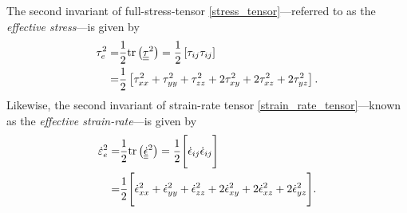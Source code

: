 The second invariant of full-stress-tensor \cref{stress_tensor}---referred to as the  \emph{effective stress}---is given by
\begin{align}
  \tau_e^2 = & \frac{1}{2} \mathrm{tr}\left( \underline{\underline{\tau}}^2 \right) = \frac{1}{2} \left[ \tau_{ij} \tau_{ij} \right] \notag \\
  \label{effectivstress}
  = &\frac{1}{2} \left[ \tau_{xx}^2 + \tau_{yy}^2 + \tau_{zz}^2 + 2\tau_{xy}^2 + 2\tau_{xz}^2 + 2\tau_{yz}^2 \right].
\end{align}
Likewise, the second invariant of strain-rate tensor \cref{strain_rate_tensor}---known as the  \emph{effective strain-rate}---is given by
\begin{align}
  \dot{\varepsilon}_e^2 = & \frac{1}{2} \mathrm{tr}\left( \underline{\underline{\dot{\epsilon}}}^2 \right) = \frac{1}{2} \Bigg[ \dot{\epsilon}_{ij} \dot{\epsilon}_{ij} \Bigg] \notag \\
  \label{effective_strain_rate}
  = &\frac{1}{2} \Bigg[ \dot{\epsilon}_{xx}^2 + \dot{\epsilon}_{yy}^2 + \dot{\epsilon}_{zz}^2 + 2\dot{\epsilon}_{xy}^2 + 2\dot{\epsilon}_{xz}^2 + 2\dot{\epsilon}_{yz}^2 \Bigg].
\end{align}

